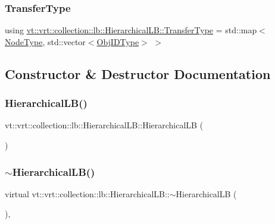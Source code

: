 \subsubsection{\texorpdfstring{Transfer\+Type}{TransferType}}
{\footnotesize\ttfamily using \hyperlink{structvt_1_1vrt_1_1collection_1_1lb_1_1_hierarchical_l_b_a83550b541c35c8a1cc0c97779d1c8184}{vt\+::vrt\+::collection\+::lb\+::\+Hierarchical\+L\+B\+::\+Transfer\+Type} =  std\+::map$<$\hyperlink{namespacevt_a866da9d0efc19c0a1ce79e9e492f47e2}{Node\+Type}, std\+::vector$<$\hyperlink{structvt_1_1vrt_1_1collection_1_1lb_1_1_base_l_b_a790b22acf448880599724749cdc4e9b3}{Obj\+I\+D\+Type}$>$ $>$}



\subsection{Constructor \& Destructor Documentation}
\mbox{\label{structvt_1_1vrt_1_1collection_1_1lb_1_1_hierarchical_l_b_ac654b0d8eca15063f5138ec56ebb2bbb}} 
\subsubsection{\texorpdfstring{Hierarchical\+L\+B()}{HierarchicalLB()}}
{\footnotesize\ttfamily vt\+::vrt\+::collection\+::lb\+::\+Hierarchical\+L\+B\+::\+Hierarchical\+LB (\begin{DoxyParamCaption}{ }\end{DoxyParamCaption})\hspace{0.3cm}{\ttfamily [default]}}

\mbox{\label{structvt_1_1vrt_1_1collection_1_1lb_1_1_hierarchical_l_b_aa2b6be5befe22ad9edcf796e9ac91568}} 
\subsubsection{\texorpdfstring{$\sim$\+Hierarchical\+L\+B()}{~HierarchicalLB()}}
{\footnotesize\ttfamily virtual vt\+::vrt\+::collection\+::lb\+::\+Hierarchical\+L\+B\+::$\sim$\+Hierarchical\+LB (\begin{DoxyParamCaption}{ }\end{DoxyParamCaption})\hspace{0.3cm}{\ttfamily [inline]}, {\ttfamily [virtual]}}



